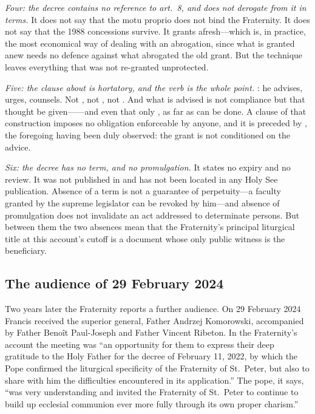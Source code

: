 \emph{Four: the decree contains no reference to  art.~8, and does not derogate from it in terms.} It does not
say that the motu proprio does not bind the Fraternity. It does not say
that the 1988 concessions survive. It grants afresh---which is, in
practice, the most economical way of dealing with an abrogation, since
what is granted anew needs no defence against what abrogated the old
grant. But the technique leaves everything that was not re-granted
unprotected.

\emph{Five: the clause about  is hortatory,
and the verb is the whole point.} : he advises, urges,
counsels. Not , not , not .
And what is advised is not compliance but that thought be given------and even that only , as far
as can be done. A clause of that construction imposes no obligation
enforceable by anyone, and it is preceded by ,
the foregoing having been duly observed: the grant is not conditioned on
the advice.

\emph{Six: the decree has no term, and no promulgation.} It states no
expiry and no review. It was not published in  and has not been located in any Holy See publication. Absence of a
term is not a guarantee of perpetuity---a faculty granted by the supreme
legislator can be revoked by him---and absence of promulgation does not
invalidate an act addressed to determinate persons. But between them the
two absences mean that the Fraternity's principal liturgical title at this
account's cutoff is a document whose only public witness is the
beneficiary.

\subsection{The audience of 29 February 2024}

Two years later the Fraternity reports a further audience. On 29 February
2024 Francis received the superior general, Father Andrzej Komorowski,
accompanied by Father Benoît Paul-Joseph and Father Vincent Ribeton. In
the Fraternity's account the meeting was ``an opportunity for them to
express their deep gratitude to the Holy Father for the decree of
February 11, 2022, by which the Pope confirmed the liturgical specificity
of the Fraternity of St.\ Peter, but also to share with him the
difficulties encountered in its application.'' The pope, it says, ``was
very understanding and invited the Fraternity of St.\ Peter to continue to
build up ecclesial communion ever more fully through its own proper
charism.''

